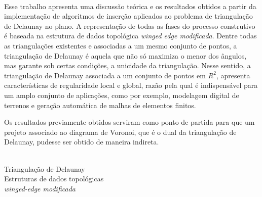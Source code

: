 
 \\ [6mm]

Esse trabalho apresenta uma discuss\~ao te\'orica e os resultados obtidos a partir da implementa\c{c}\~ao de algoritmos de inser\c{c}\~ao aplicados ao problema de triangula\c{c}\~ao de Delaunay no plano. A representa\c{c}\~ao de todas as fases do processo construtivo  \'e baseada na estrutura de dados topol\'ogica \textit{winged edge modificada}. Dentre todas as triangula\c{c}\~oes existentes e associadas a um mesmo conjunto de pontos, a triangula\c{c}\~ao de Delaunay \'e aquela que n\~ao s\'o maximiza o menor dos \^angulos, mas garante sob certas condi\c{c}\~oes, a unicidade da triangula\c{c}\~ao. Nesse sentido, a triangula\c{c}\~ao de Delaunay associada a um conjunto de pontos em $R^2$, apresenta caracter\'isticas de regularidade local e global, raz\~ao pela qual \'e indispens\'avel para um amplo conjunto de aplica\c{c}\~oes, como por exemplo, modelagem digital de terrenos e gera\c{c}\~ao autom\'atica de malhas de elementos finitos.

Os resultados previamente obtidos serviram como ponto de partida para que um projeto associado ao diagrama de Voronoi, que \'e o dual da triangulação de Delaunay, pudesse ser obtido de maneira indireta.

\vspace{15mm}

\\

\hspace{-7mm}
Triangula\c{c}\~{a}o de Delaunay \\ [2mm]
Estruturas de dados topol\'{o}gicas \\ [2mm]
\textit{winged-edge modificada} \\ [2mm]





